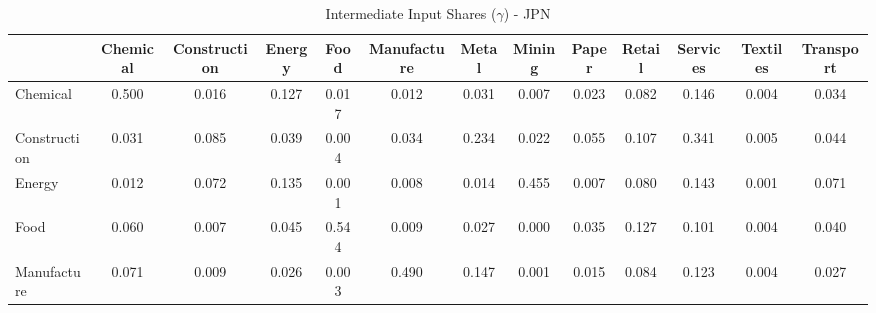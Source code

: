 \begin{table}[htbp]
\centering
\caption{Intermediate Input Shares ($\gamma$) - JPN} 
\label{tab:gamma_JPN}
\begin{tabular}{lcccccccccccc}
  \hline
 & Chemical & Construction & Energy & Food & Manufacture & Metal & Mining & Paper & Retail & Services & Textiles & Transport \\ 
  \hline
Chemical & \textcolor[RGB]{5,3,250}{0.500} & \textcolor[RGB]{175,113,80}{0.016} & \textcolor[RGB]{46,30,209}{0.127} & \textcolor[RGB]{174,112,81}{0.017} & \textcolor[RGB]{189,123,66}{0.012} & \textcolor[RGB]{138,89,117}{0.031} & \textcolor[RGB]{212,138,42}{0.007} & \textcolor[RGB]{161,104,94}{0.023} & \textcolor[RGB]{73,47,182}{0.082} & \textcolor[RGB]{34,22,221}{0.146} & \textcolor[RGB]{227,147,28}{0.004} & \textcolor[RGB]{129,84,126}{0.034} \\ 
  Construction & \textcolor[RGB]{136,88,119}{0.031} & \textcolor[RGB]{69,45,186}{0.085} & \textcolor[RGB]{122,79,133}{0.039} & \textcolor[RGB]{223,144,32}{0.004} & \textcolor[RGB]{131,85,124}{0.034} & \textcolor[RGB]{23,15,232}{0.234} & \textcolor[RGB]{163,105,92}{0.022} & \textcolor[RGB]{106,69,149}{0.055} & \textcolor[RGB]{55,36,200}{0.107} & \textcolor[RGB]{18,11,237}{0.341} & \textcolor[RGB]{220,142,35}{0.005} & \textcolor[RGB]{117,76,138}{0.044} \\ 
  Energy & \textcolor[RGB]{188,121,67}{0.012} & \textcolor[RGB]{83,54,172}{0.072} & \textcolor[RGB]{41,26,214}{0.135} & \textcolor[RGB]{243,157,12}{0.001} & \textcolor[RGB]{205,133,50}{0.008} & \textcolor[RGB]{181,117,74}{0.014} & \textcolor[RGB]{11,7,244}{0.455} & \textcolor[RGB]{211,136,44}{0.007} & \textcolor[RGB]{76,49,179}{0.080} & \textcolor[RGB]{35,23,220}{0.143} & \textcolor[RGB]{244,158,11}{0.001} & \textcolor[RGB]{89,57,166}{0.071} \\ 
  Food & \textcolor[RGB]{99,64,156}{0.060} & \textcolor[RGB]{207,134,48}{0.007} & \textcolor[RGB]{115,74,140}{0.045} & \textcolor[RGB]{0,0,255}{0.544} & \textcolor[RGB]{197,127,58}{0.009} & \textcolor[RGB]{149,96,106}{0.027} & \textcolor[RGB]{253,164,2}{0.000} & \textcolor[RGB]{126,81,129}{0.035} & \textcolor[RGB]{48,31,207}{0.127} & \textcolor[RGB]{60,39,195}{0.101} & \textcolor[RGB]{228,148,27}{0.004} & \textcolor[RGB]{120,78,135}{0.040} \\ 
  Manufacture & \textcolor[RGB]{87,56,168}{0.071} & \textcolor[RGB]{198,128,57}{0.009} & \textcolor[RGB]{154,100,101}{0.026} & \textcolor[RGB]{234,151,21}{0.003} & \textcolor[RGB]{7,5,248}{0.490} & \textcolor[RGB]{32,21,223}{0.147} & \textcolor[RGB]{241,156,14}{0.001} & \textcolor[RGB]{179,116,76}{0.015} & \textcolor[RGB]{71,46,184}{0.084} & \textcolor[RGB]{51,33,204}{0.123} & \textcolor[RGB]{221,143,34}{0.004} & \textcolor[RGB]{152,99,103}{0.027} \\ 

\end{tabular}
\end{table}
